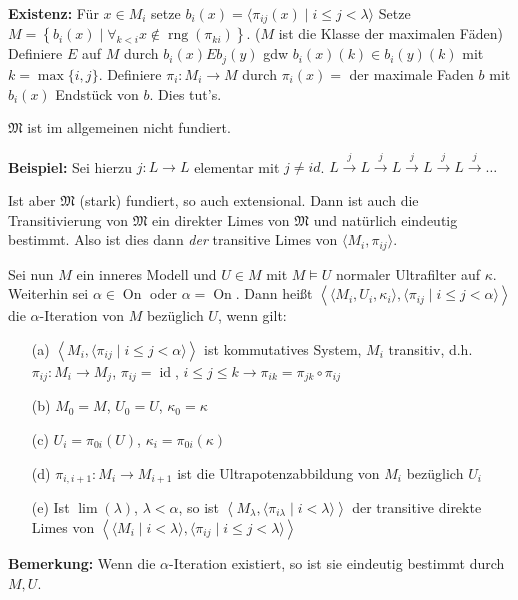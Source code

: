 \documentclass[a4paper,fontsize=11pt]{scrartcl}
\newcommand{\rng}{\operatorname{rng}}
\newcommand{\On}{\operatorname{On}}
\newcommand{\id}{\operatorname{id}}
\begin{document}
	{\bf Existenz:} Für $x\in M_i$ setze $b_i(x)=\langle \pi_{ij}(x)\mid i\le j<\lambda\rangle$
		Setze $M=\left\{ b_i(x)\mid \forall_{k<i} x\not\in\rng(\pi_{ki})\right\}$. 
		($M$ ist die Klasse der maximalen Fäden)
		Definiere $E$ auf $M$ durch $b_i(x)Eb_j(y)$ gdw $b_i(x)(k)\in b_i(y)(k)$ mit $k=\max\{i,j\}$.
		Definiere $\pi_i\colon M_i\to M$ durch $\pi_i(x) = $ der maximale Faden $b$ mit $b_i(x)$ Endstück von $b$.
		Dies tut's.

	$\mathfrak M$ ist im allgemeinen nicht fundiert.
	
	{\bf Beispiel:} Sei hierzu $j\colon L\to L$ elementar mit $j\neq id$.
	$L \overset{j}{\to} L \overset{j}{\to} L \overset{j}{\to} L \overset{j}{\to} L \overset{j}{\to} \ldots$

	Ist aber $\mathfrak M$ (stark) fundiert, so auch extensional.
	Dann ist auch die Transitivierung von $\mathfrak M$ ein direkter Limes von $\mathfrak M$ und natürlich eindeutig bestimmt.
	Also ist dies dann {\em der} transitive Limes von $\langle M_i,\pi_{ij}\rangle$.


	Sei nun $M$ ein inneres Modell und $U\in M$ mit $M\models U$ normaler Ultrafilter auf $\kappa$.
	Weiterhin sei $\alpha\in\On$ oder $\alpha=\On$.
	Dann heißt $\left\langle\langle M_i, U_i,\kappa_i\rangle, \langle \pi_{ij}\mid i\le j<\alpha\rangle\right\rangle$
	die $\alpha$-Iteration von $M$ bezüglich $U$, wenn gilt:
	\begin{itemize}
		\item[(a)] $\left\langle M_i,\langle\pi_{ij}\mid i\le j<\alpha\rangle\right\rangle$ ist kommutatives System, $M_i$ transitiv, d.h.
			$\pi_{ij}\colon M_i\to M_j$, $\pi_{ij}=\id$, $i\le j\le k\to \pi_{ik}=\pi_{jk}\circ\pi_{ij}$
		\item[(b)] $M_0=M$, $U_0=U$, $\kappa_0=\kappa$
		\item[(c)] $U_i=\pi_{0i}(U)$, $\kappa_i=\pi_{0i}(\kappa)$
		\item[(d)] $\pi_{i,i+1}\colon M_i\to M_{i+1}$ ist die Ultrapotenzabbildung von $M_i$ bezüglich $U_i$
		\item[(e)] Ist $\lim(\lambda)$, $\lambda<\alpha$, so ist $\left\langle M_{\lambda},\langle \pi_{i\lambda}\mid i<\lambda\rangle\right\rangle$ der transitive direkte Limes von $\left\langle\langle M_i\mid  i<\lambda\rangle, \langle\pi_{ij}\mid i\le j<\lambda\rangle\right\rangle$
	\end{itemize}

{\bf Bemerkung:} Wenn die $\alpha$-Iteration existiert, so ist sie eindeutig bestimmt durch $M,U$.
\end{document}
